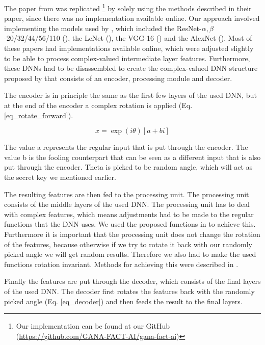 The paper from \cite{xiang2020interpretable} was replicated \footnote{Our implementation can be found at our GitHub (\url{https://github.com/GANA-FACT-AI/gana-fact-ai})} by solely using the methods described in their paper, since there was no implementation available online. Our approach involved implementing the models used by \cite{xiang2020interpretable}, which included the ResNet-$\alpha,\beta$-20/32/44/56/110 (\cite{DBLP:journals/corr/HeZRS15}), the LeNet (\cite{lecun1998gradient}), the VGG-16 (\cite{simonyan2015deep}) and the AlexNet (\cite{NIPS2012_c399862d}). Most of these papers had implementations available online, which were adjusted slightly to be able to process complex-valued intermediate layer features. Furthermore, these DNNs had to be disassembled to create the complex-valued DNN structure proposed by \cite{xiang2020interpretable} that consists of an encoder, processing module and decoder.

The encoder is in principle the same as the first few layers of the used DNN, but at the end of the encoder a complex rotation is applied (Eq. \ref{eq_rotate_forward}).

\begin{equation}
    x = \exp(i\theta)[a+bi]
    \label{eq_rotate_forward}
\end{equation}

The value a represents the regular input that is put through the encoder. The value b is the fooling counterpart that can be seen as a different input that is also put through the encoder. Theta is picked to be random angle, which will act as the secret key we mentioned earlier.

The resulting features are then fed to the processing unit. The processing unit consists of the middle layers of the used DNN. The processing unit has to deal with complex features, which means adjustments had to be made to the regular functions that the DNN uses. We used the proposed functions in \cite{DBLP:journals/corr/TrabelsiBSSSMRB17} to achieve this. Furthermore it is important that the processing unit does not change the rotation of the features, because otherwise if we try to rotate it back with our randomly picked angle we will get random results. Therefore we also had to make the used functions rotation invariant. Methods for achieving this were described in \cite{xiang2020interpretable}.

Finally the features are put through the decoder, which consists of the final layers of the used DNN. The decoder first rotates the features back with the randomly picked angle (Eq. \ref{eq_decoder}) and then feeds the result to the final layers.

